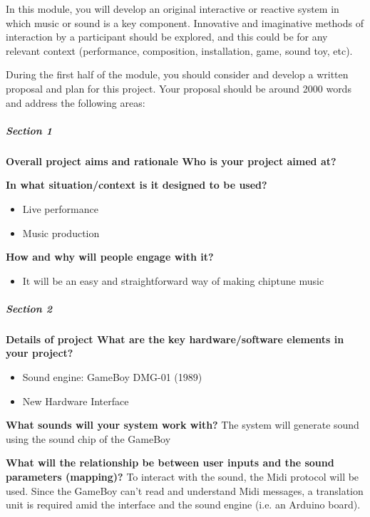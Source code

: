 \documentclass[]{article}
\author{Silvio Gregorini}
\title{}
\date{2019}
\begin{document}
    In this module, you will develop an original interactive or reactive system
 in which music or sound is a key component. Innovative and imaginative
  methods of interaction by a participant should be explored, and this
   could be for any relevant context (performance, composition, installation,
    game, sound toy, etc).
    
During the first half of the module, you should consider and develop a 
written proposal and plan for this project. Your proposal should be around 
2000 words and address the following areas:

\subparagraph[]{Section 1}
    \textbf{Overall project aims and rationale Who is your project aimed at?}

    \textbf{In what situation/context is it designed to be used?}
    
        \begin{itemize}
        \item Live performance
        \item Music production
        \end{itemize}

    \textbf{How and why will people engage with it?}

        \begin{itemize}
        \item It will be an easy and straightforward way of making chiptune music
        \end{itemize}

\subparagraph[]{Section 2}

    \textbf{Details of project What are the key hardware/software elements in your
    project?}

        \begin{itemize}
            \item Sound engine: GameBoy DMG-01 (1989)
            \item New Hardware Interface
        \end{itemize}

    \textbf{What sounds will your system work with?}
    The system will generate sound using the sound chip of the GameBoy

    \textbf{What will the relationship be between user inputs and the sound 
    parameters (mapping)?} 
    To interact with the sound, the Midi protocol will be used.
    Since the GameBoy can't read and understand Midi messages,
    a translation unit is required amid the interface and the sound engine (i.e. an Arduino board).
\end{document}
